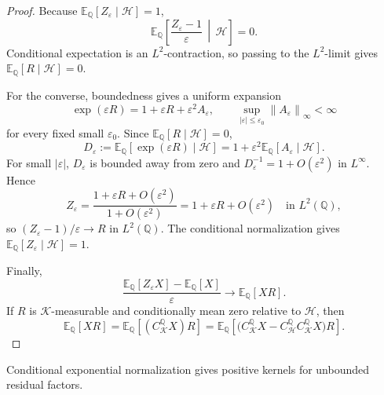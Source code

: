 \documentclass[11pt,a4paper]{amsart}
\theoremstyle{plain}
\theoremstyle{definition}
\theoremstyle{remark}
\newcommand{\QQ}{\mathbb{Q}}
\newcommand{\EE}{\mathbb{E}}
\newcommand{\cH}{\mathcal{H}}
\newcommand{\cK}{\mathcal{K}}
\newcommand{\eps}{\varepsilon}
\newcommand{\norm}[1]{\left\lVert #1\right\rVert}
\begin{document}
\begin{proof}
Because \(\EE_\QQ[Z_\eps\mid\cH]=1\),
\[
        \EE_\QQ\!\left[\frac{Z_\eps-1}{\eps}\,\middle|\,\cH\right]=0.
\]
Conditional expectation is an \(L^2\)-contraction, so passing to the \(L^2\)-limit gives
\(\EE_\QQ[R\mid\cH]=0\).

For the converse, boundedness gives a uniform expansion
\[
        \exp(\eps R)=1+\eps R+\eps^2 A_\eps,
        \qquad
        \sup_{|\eps|\le\eps_0}\norm{A_\eps}_\infty<\infty
\]
for every fixed small \(\eps_0\).  Since \(\EE_\QQ[R\mid\cH]=0\),
\[
        D_\eps:=\EE_\QQ[\exp(\eps R)\mid\cH]
        =1+\eps^2\EE_\QQ[A_\eps\mid\cH].
\]
For small \(|\eps|\), \(D_\eps\) is bounded away from zero and
\(D_\eps^{-1}=1+O(\eps^2)\) in \(L^\infty\).  Hence
\[
        Z_\eps
        =
        \frac{1+\eps R+O(\eps^2)}{1+O(\eps^2)}
        =
        1+\eps R+O(\eps^2)
        \quad\text{in }L^2(\QQ),
\]
so \((Z_\eps-1)/\eps\to R\) in \(L^2(\QQ)\).  The conditional normalization gives
\(\EE_\QQ[Z_\eps\mid\cH]=1\).

Finally,
\[
        \frac{\EE_\QQ[Z_\eps X]-\EE_\QQ[X]}{\eps}
        \to
        \EE_\QQ[XR].
\]
If \(R\) is \(\cK\)-measurable and conditionally mean zero relative to \(\cH\), then
\[
        \EE_\QQ[XR]
        =
        \EE_\QQ[(C_{\cK}^{\QQ}X)R]
        =
        \EE_\QQ\!\left[
        \bigl(C_{\cK}^{\QQ}X-C_{\cH}^{\QQ}C_{\cK}^{\QQ}X\bigr)R
        \right].
\]
\end{proof}

Conditional exponential normalization gives positive kernels for unbounded residual factors.
\end{document}
